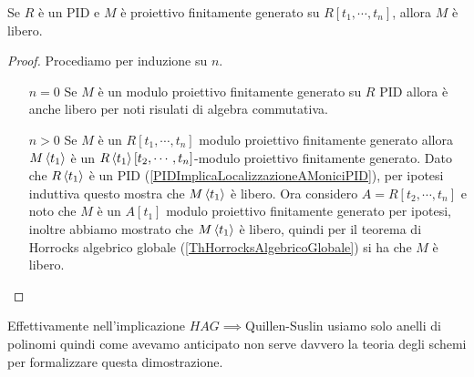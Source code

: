 \begin{theorem}\label{ThQuillenSuslin}
Se $R$ \`e un PID e $M$ \`e proiettivo finitamente generato su $R[t_1,\cdots, t_n]$, allora $M$ \`e libero.
\end{theorem}
\begin{proof}
Procediamo per induzione su $n$. 
\setlength{\leftmargini}{0cm}
\begin{itemize}
\item[$\boxed{n=0}$] Se $M$ \`e un modulo proiettivo finitamente generato su $R$ PID allora \`e anche libero per noti risulati di algebra commutativa.
\item[$\boxed{n>0}$] Se $M$ \`e un $R[t_1,\cdots,t_n]$ modulo proiettivo finitamente generato allora $M\left\langle {t_1}\right\rangle$ \`e un $R\left\langle {t_1}\right\rangle[t_2,\cdots, t_n]$-modulo proiettivo finitamente generato. Dato che $R\left\langle {t_1}\right\rangle$ \`e un PID (\ref{PIDImplicaLocalizzazioneAMoniciPID}), per ipotesi induttiva questo mostra che $M\left\langle {t_1}\right\rangle$ \`e libero. Ora considero $A=R[t_2,\cdots, t_n]$ e noto che $M$ \`e un $A[t_1]$ modulo proiettivo finitamente generato per ipotesi, inoltre abbiamo mostrato che $M\left\langle {t_1}\right\rangle$ \`e libero, quindi per il teorema di Horrocks algebrico globale (\ref{ThHorrocksAlgebricoGlobale}) si ha che $M$ \`e libero.
\end{itemize}
\setlength{\leftmargini}{0.5cm}
\end{proof}

\begin{remark}
Effettivamente nell'implicazione $HAG\implies$Quillen-Suslin usiamo solo anelli di polinomi quindi come avevamo anticipato non serve davvero la teoria degli schemi per formalizzare questa dimostrazione.
\end{remark}
